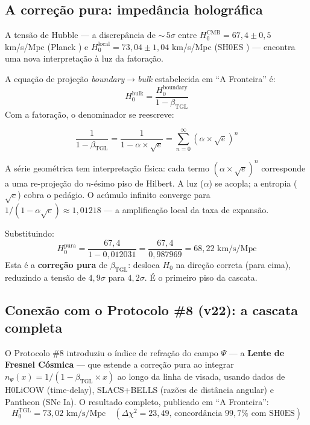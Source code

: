 \documentclass[12pt,a4paper,twoside]{article}
\newcommand{\betatgl}{\beta_{\!\scriptscriptstyle\mathrm{TGL}}}
\newcommand{\boundary}{\textit{boundary}}
\newcommand{\bulk}{\textit{bulk}}
\begin{document}
\subsection{A correção pura: impedância holográfica}

A tensão de Hubble --- a discrepância de ${\sim}\,5\sigma$ entre $H_0^{\text{CMB}} = 67{,}4 \pm 0{,}5$ km/s/Mpc (Planck \cite{Planck2018}) e $H_0^{\text{local}} = 73{,}04 \pm 1{,}04$ km/s/Mpc (SH0ES \cite{Riess2022}) --- encontra uma nova interpretação à luz da fatoração.

A equação de projeção \boundary$\to$\bulk{} estabelecida em ``A Fronteira'' \cite{Miguel2026Fronteira} é:
%
\begin{equation}
H_0^{\text{bulk}} = \frac{H_0^{\text{boundary}}}{1 - \betatgl}
\label{eq:hubble_pura}
\end{equation}
%
Com a fatoração, o denominador se reescreve:
%
\begin{equationbox}[title={Impedância holográfica fatorada}]
\begin{equation}
\frac{1}{1 - \betatgl} = \frac{1}{1 - \alpha \times \sqrt{e}} = \sum_{n=0}^{\infty} (\alpha \times \sqrt{e})^n
\label{eq:impedancia}
\end{equation}
\end{equationbox}
%
A série geométrica tem interpretação física: cada termo $(\alpha \times \sqrt{e})^n$ corresponde a uma re-projeção do $n$-ésimo piso de Hilbert. A luz ($\alpha$) se acopla; a entropia ($\sqrt{e}$) cobra o pedágio. O acúmulo infinito converge para $1/(1 - \alpha\sqrt{e}) \approx 1{,}01218$ --- a amplificação local da taxa de expansão.

Substituindo:
%
\begin{equation}
H_0^{\text{pura}} = \frac{67{,}4}{1 - 0{,}012031} = \frac{67{,}4}{0{,}987969} = 68{,}22 \text{ km/s/Mpc}
\end{equation}
%
Esta é a \textbf{correção pura} de $\betatgl$: desloca $H_0$ na direção correta (para cima), reduzindo a tensão de $4{,}9\sigma$ para $4{,}2\sigma$. É o primeiro piso da cascata.


\subsection{Conexão com o Protocolo \#8 (v22): a cascata completa}
\label{subsec:cascata}

O Protocolo \#8 \cite{Miguel2026Fronteira} introduziu o índice de refração do campo $\Psi$ --- a \textbf{Lente de Fresnel Cósmica} --- que estende a correção pura ao integrar $n_\Psi(x) = 1/(1 - \betatgl \times x)$ ao longo da linha de visada, usando dados de H0LiCOW (time-delay), SLACS+BELLS (razões de distância angular) e Pantheon (SNe Ia). O resultado completo, publicado em ``A Fronteira'':
%
\begin{equation}
H_0^{\text{TGL}} = 73{,}02 \text{ km/s/Mpc} \quad (\Delta\chi^2 = 23{,}49 \text{, concordância } 99{,}7\% \text{ com SH0ES})
\end{equation}
\end{document}
